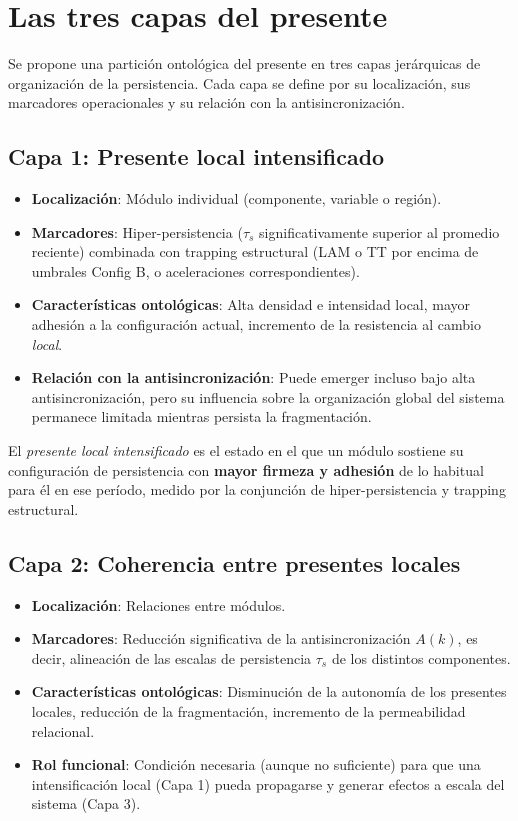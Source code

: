\section{Las tres capas del presente}

Se propone una partición ontológica del presente en tres capas jerárquicas de organización de la persistencia. Cada capa se define por su localización, sus marcadores operacionales y su relación con la antisincronización.

\subsection{Capa 1: Presente local intensificado}

\begin{itemize}
    \item \textbf{Localización}: Módulo individual (componente, variable o región).
    \item \textbf{Marcadores}: Hiper-persistencia ($\tau_s$ significativamente superior al promedio reciente) combinada con trapping estructural (LAM o TT por encima de umbrales Config B, o aceleraciones correspondientes).
    \item \textbf{Características ontológicas}: Alta densidad e intensidad local, mayor adhesión a la configuración actual, incremento de la resistencia al cambio \textit{local}.
    \item \textbf{Relación con la antisincronización}: Puede emerger incluso bajo alta antisincronización, pero su influencia sobre la organización global del sistema permanece limitada mientras persista la fragmentación.
\end{itemize}

\begin{conceptbox}[Definición]
El \textit{presente local intensificado} es el estado en el que un módulo sostiene su configuración de persistencia con \textbf{mayor firmeza y adhesión} de lo habitual para él en ese período, medido por la conjunción de hiper-persistencia y trapping estructural.
\end{conceptbox}

\subsection{Capa 2: Coherencia entre presentes locales}

\begin{itemize}
    \item \textbf{Localización}: Relaciones entre módulos.
    \item \textbf{Marcadores}: Reducción significativa de la antisincronización $A(k)$, es decir, alineación de las escalas de persistencia $\tau_s$ de los distintos componentes.
    \item \textbf{Características ontológicas}: Disminución de la autonomía de los presentes locales, reducción de la fragmentación, incremento de la permeabilidad relacional.
    \item \textbf{Rol funcional}: Condición necesaria (aunque no suficiente) para que una intensificación local (Capa 1) pueda propagarse y generar efectos a escala del sistema (Capa 3).
\end{itemize}


